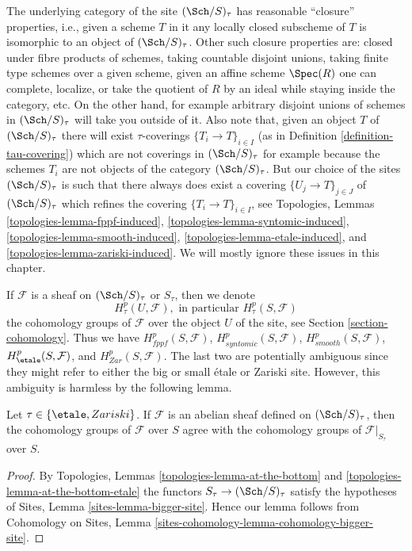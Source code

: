 \noindent
The underlying category of the site $(\Sch/S)_\tau$ has reasonable
``closure'' properties, i.e., given a scheme $T$ in it any locally closed
subscheme of $T$ is isomorphic to an object of $(\Sch/S)_\tau$.
Other such closure properties are: closed under fibre products of schemes,
taking countable disjoint unions,
taking finite type schemes over a given scheme, given an affine scheme
$\Spec(R)$ one can complete, localize, or take the quotient of $R$
by an ideal while staying inside the category, etc.
On the other hand, for example arbitrary disjoint unions
of schemes in $(\Sch/S)_\tau$ will take you outside of it.
Also note that, given an object $T$ of $(\Sch/S)_\tau$ there will exist
$\tau$-coverings $\{T_i \to T\}_{i \in I}$ (as in
Definition \ref{definition-tau-covering})
which are not coverings in $(\Sch/S)_\tau$ for example
because the schemes $T_i$ are not objects of the category
$(\Sch/S)_\tau$. But our choice of the sites $(\Sch/S)_\tau$
is such that there always does exist
a covering $\{U_j \to T\}_{j \in J}$ of $(\Sch/S)_\tau$ which refines
the covering $\{T_i \to T\}_{i \in I}$, see
Topologies, Lemmas
\ref{topologies-lemma-fppf-induced},
\ref{topologies-lemma-syntomic-induced},
\ref{topologies-lemma-smooth-induced},
\ref{topologies-lemma-etale-induced}, and
\ref{topologies-lemma-zariski-induced}.
We will mostly ignore these issues in this chapter.

\medskip\noindent
If $\mathcal{F}$ is a sheaf on $(\Sch/S)_\tau$ or $S_\tau$, then
we denote
$$
H^p_\tau(U, \mathcal{F}), \text{ in particular }
H^p_\tau(S, \mathcal{F})
$$
the cohomology groups of $\mathcal{F}$ over the object $U$ of the site, see
Section \ref{section-cohomology}. Thus we have
$H^p_{fppf}(S, \mathcal{F})$,
$H^p_{syntomic}(S, \mathcal{F})$,
$H^p_{smooth}(S, \mathcal{F})$,
$H^p_\etale(S, \mathcal{F})$, and
$H^p_{Zar}(S, \mathcal{F})$. The last two are potentially ambiguous since
they might refer to either the big or small \'etale or Zariski site. However,
this ambiguity is harmless by the following lemma.

\begin{lemma}
\label{lemma-compare-cohomology-big-small}
Let $\tau \in \{\etale, Zariski\}$.
If $\mathcal{F}$ is an abelian sheaf defined on
$(\Sch/S)_\tau$, then
the cohomology groups of $\mathcal{F}$ over $S$ agree with the cohomology
groups of $\mathcal{F}|_{S_\tau}$ over $S$.
\end{lemma}

\begin{proof}
By
Topologies, Lemmas \ref{topologies-lemma-at-the-bottom} and
\ref{topologies-lemma-at-the-bottom-etale}
the functors $S_\tau \to (\Sch/S)_\tau$
satisfy the hypotheses of
Sites, Lemma \ref{sites-lemma-bigger-site}.
Hence our lemma follows from
Cohomology on Sites, Lemma \ref{sites-cohomology-lemma-cohomology-bigger-site}.
\end{proof}

